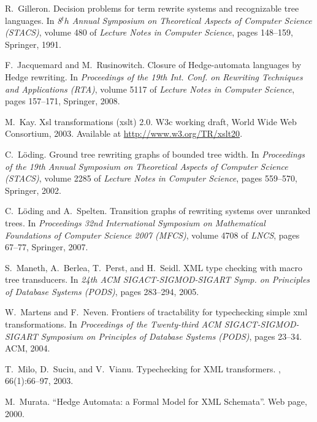 \documentclass[a4paper]{article}
\theoremstyle{plain}
\begin{document}
\begin{thebibliography}{10}
R.~Gilleron.
\newblock Decision problems for term rewrite systems and recognizable tree languages.
\newblock In {\em 8$^th$ Annual Symposium on Theoretical Aspects of Computer
  Science (STACS)}, volume 480 of {\em Lecture Notes in Computer Science}, pages
  148--159, Springer, 1991.

F.~Jacquemard and M.~Rusinowitch.
\newblock Closure of {H}edge-automata languages by {H}edge rewriting.
\newblock In {\em {P}roceedings of the 19th
  {I}nt. {C}onf. on {R}ewriting {T}echniques and {A}pplications
  ({RTA})}, volume 5117 of {\em Lecture Notes in Computer Science}, pages
  157--171, Springer, 2008.

M.~Kay.
\newblock Xsl transformations (xslt) 2.0.
\newblock W3c working draft, World Wide Web Consortium, 2003.
\newblock Available at \url{http://www.w3.org/TR/xslt20}.

C.~L{\"o}ding.
\newblock Ground tree rewriting graphs of bounded tree width.
\newblock In {\em Proceedings of the 19th Annual Symposium on Theoretical
  Aspects of Computer Science (STACS)}, volume 2285 of {\em Lecture Notes in
  Computer Science}, pages 559--570, Springer, 2002.

C.~L{\"o}ding and A.~Spelten.
\newblock Transition graphs of rewriting systems over unranked trees.
\newblock In {\em Proceedings 32nd International Symposium on Mathematical Foundations of
  Computer Science 2007 (MFCS)}, 
  volume 4708 of {\em LNCS}, pages 67--77, Springer, 2007.

S.~Maneth, A.~Berlea, T.~Perst, and H.~Seidl.
\newblock XML type checking with macro tree transducers.
\newblock In {\em 24th ACM SIGACT-SIGMOD-SIGART Symp. on Principles of Database
  Systems (PODS)}, pages 283--294, 2005.

W.~Martens and F.~Neven.
\newblock Frontiers of tractability for typechecking simple xml
  transformations.
\newblock In {\em Proceedings of the Twenty-third ACM SIGACT-SIGMOD-SIGART
  Symposium on Principles of Database Systems (PODS)}, pages 23--34. ACM, 2004.

T.~Milo, D.~Suciu, and V.~Vianu.
\newblock Typechecking for {XML} transformers.
, 66(1):66--97, 2003.

M.~Murata.
\newblock ``{Hedge Automata: a Formal Model for {XML} Schemata}''.
\newblock Web page, 2000.


\end{thebibliography}
\end{document}
